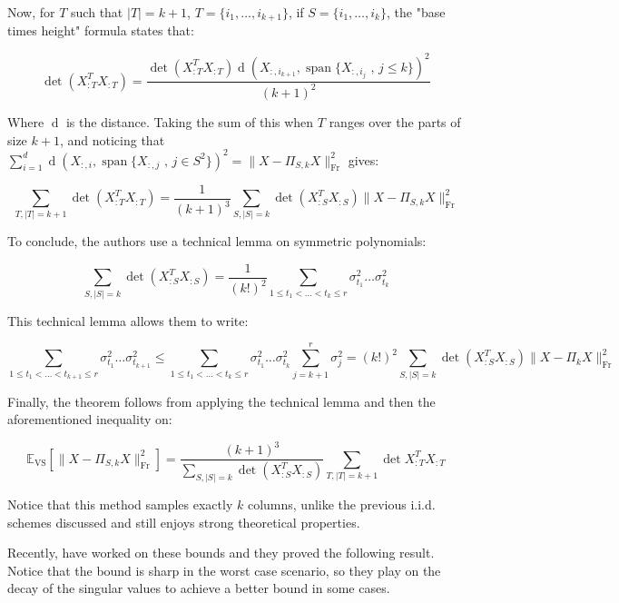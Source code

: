 Now, for $T$ such that $\lvert T \rvert = k+1$, $T = \{i_1, \dots, i_{k+1}\}$, if $S = \{i_1, \dots, i_k\}$, the "base times height" formula states that: 

\[ \operatorname{det}(X_{:T}^TX_{:T}) = \dfrac{\operatorname{det}(X_{:T}^TX_{:T}) \operatorname{d}(X_{:,i_{k+1}}, \operatorname{span}\{X_{:,i_j} \text{ , } j \leq k\})^2}{(k+1)^2}  \]

Where $\operatorname{d}$ is the distance. Taking the sum of this when $T$ ranges over the parts of size $k+1$, and noticing that $\sum \limits_{i = 1}^d \operatorname{d}(X_{:,i}, \operatorname{span}\{X_{:,j} \text{ , } j \in S^2\})^2 =  \lVert X - \Pi_{S,k}X \rVert_{\operatorname{Fr}}^2$ gives:

\[ \sum \limits_{T, \lvert T \rvert = k +1 } \operatorname{det}(X_{:T}^TX_{:T}) = \dfrac{1}{(k+1)^3} \sum \limits_{S, \lvert S \rvert = k } \operatorname{det}(X_{:S}^TX_{:S} ) \lVert X - \Pi_{S,k}X \rVert_{\operatorname{Fr}}^2  \]

To conclude, the authors use a technical lemma on symmetric polynomials:

\[\sum \limits_{S, \lvert S \rvert = k } \operatorname{det}(X_{:S}^TX_{:S} ) = \dfrac{1}{(k!)^2} \sum \limits_{1 \leq t_1 < \dots < t_k \leq r } \sigma_{t_1}^2 \dots \sigma_{t_k}^2\]

This technical lemma allows them to write:

\[\sum \limits_{1 \leq t_1 < \dots < t_{k+1} \leq r } \sigma_{t_1}^2 \dots \sigma_{t_{k+1}}^2 \leq \sum \limits_{1 \leq t_1 < \dots < t_k \leq r } \sigma_{t_1}^2 \dots \sigma_{t_k}^2 \sum\limits_{j=k+1}^r \sigma_j^2 = (k!)^2 \sum \limits_{S, \lvert S \rvert = k } \operatorname{det}(X_{:S}^TX_{:S} ) \lVert X - \Pi_{k}X \rVert_{\operatorname{Fr}}^2  \]

Finally, the theorem follows from applying the technical lemma and then the aforementioned inequality on:

\[\mathbb{E}_{\operatorname{VS}} [\lVert X - \Pi_{S,k}X \rVert_{\operatorname{Fr}}^2] = \dfrac{(k+1)^3}{\sum \limits_{S, \lvert S \rvert = k } \operatorname{det}(X_{:S}^TX_{:S})} \sum \limits_{T, \lvert T \rvert = k +1 } \operatorname{det}X_{:T}^TX_{:T}  \]


Notice that this method samples exactly $k$ columns, unlike the previous i.i.d. schemes discussed and still enjoys strong theoretical properties.

Recently, \cite{derezinski_improved_2021} have worked on these bounds and they proved the following result. Notice that the bound is sharp in the worst case scenario, so they play on the decay of the singular values to achieve a better bound in some cases.

